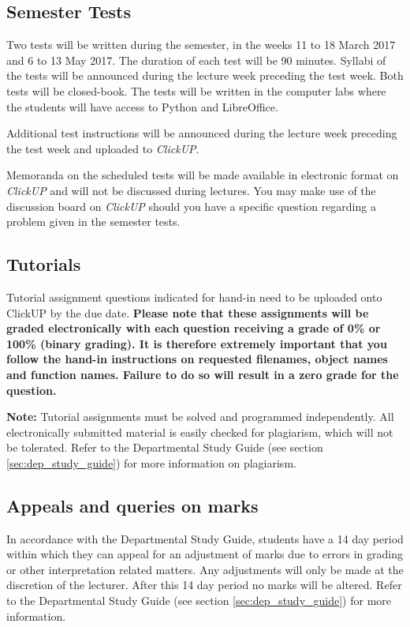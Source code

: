     \subsection{Semester Tests}
        Two tests will be written during the semester, in the weeks 11
        to 18 March 2017 and 6 to 13 May 2017. The duration of each test will
        be 90 minutes. Syllabi of the tests will be announced during the
        lecture week preceding the test week. Both tests will be closed-book.
        The tests will be written in the computer labs where the students will
        have access to Python and LibreOffice.

        Additional test instructions will be announced during the lecture
        week preceding the test week and uploaded to {\it ClickUP}.

        Memoranda on the scheduled tests will be made available in electronic
        format on {\it ClickUP} and will not be discussed during lectures. You
        may make use of the discussion board on {\it ClickUP} should you have a
        specific question regarding a problem given in the semester tests.

    \subsection{Tutorials}
        Tutorial assignment questions indicated for hand-in need to be
        uploaded onto ClickUP by the due date. \textbf{Please note that
        these assignments will be graded electronically with each
        question receiving a grade of 0\% or 100\% (binary grading). It
        is therefore extremely important that you follow the hand-in
        instructions on requested filenames, object names and function
        names. Failure to do so will result in a zero grade for the
        question.}

        \textbf{Note:} Tutorial assignments must be solved and programmed
        independently. All electronically submitted material is easily checked
        for plagiarism, which will not be tolerated. Refer to the Departmental
        Study Guide (see section \ref{sec:dep_study_guide}) for more
        information on plagiarism.

    \subsection{Appeals and queries on marks}
        In accordance with the Departmental Study Guide, students have a 14
        day period within which they can appeal for an adjustment of marks
        due to errors in grading or other interpretation related matters.
        Any adjustments will only be made at the discretion of the lecturer.
        After this 14 day period no marks will be altered. Refer to the
        Departmental Study Guide (see section \ref{sec:dep_study_guide})
        for more information.

